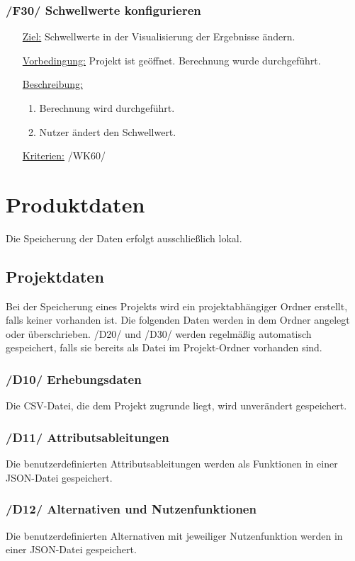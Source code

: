 \documentclass{article}
\begin{document}
\subsubsection*{/F30/ Schwellwerte konfigurieren}
\begin{itemize}
    \item[\underline{Ziel:}] Schwellwerte in der Visualisierung der Ergebnisse ändern.
    \item[\underline{Vorbedingung:}] Projekt ist geöffnet. Berechnung wurde durchgeführt.
    \item[\underline{Beschreibung:}]
    \begin{enumerate}
        \item Berechnung wird durchgeführt.
        \item Nutzer ändert den Schwellwert.
    \end{enumerate}
    \item[\underline{Kriterien:}] /WK60/
\end{itemize}

\clearpage
\section{Produktdaten}
Die Speicherung der Daten erfolgt ausschließlich lokal.
\subsection{Projektdaten}
Bei der Speicherung eines Projekts wird ein projektabhängiger Ordner erstellt, falls keiner vorhanden ist. Die folgenden Daten werden in dem Ordner angelegt oder überschrieben. \newline
/D20/ und /D30/ werden regelmäßig automatisch gespeichert, falls sie bereits als Datei im Projekt-Ordner vorhanden sind.
\subsubsection*{/D10/ Erhebungsdaten}
Die CSV-Datei, die dem Projekt zugrunde liegt, wird unverändert gespeichert.
\subsubsection*{/D11/ Attributsableitungen}
Die benutzerdefinierten Attributsableitungen werden als Funktionen in einer JSON-Datei gespeichert.
\subsubsection*{/D12/ Alternativen und Nutzenfunktionen}
Die benutzerdefinierten Alternativen mit jeweiliger Nutzenfunktion werden in einer JSON-Datei gespeichert.
\end{document}
